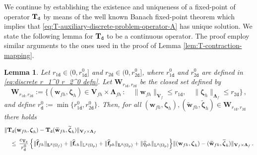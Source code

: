 \documentclass[11pt]{article}
\numberwithin{equation}{section}
\newcommand{\bLambda}{{\boldsymbol\Lambda}}
\newcommand{\bzeta}{{\boldsymbol\zeta}}
\newcommand{\bw}{{\mathbf{w}}}
\newcommand{\f}{\mathbf{f}}
\newcommand{\0}{{\mathbf{0}}}
\def\bV{\mathbf{V}}
\def\bW{\mathbf{W}}
\def\bT{\mathbf{T}}
\newcommand{\bL}{\mathbf{L}}
\newcommand\bbL{\mathbb{L}}
\def\L{\mathrm{L}}
\def\ttd{\mathtt{d}}
\def\wt{\widetilde}
\def\wh{\widehat}
\newtheorem{lem}[thm]{Lemma}
\numberwithin{equation}{section}
\begin{document}
We continue by establishing the existence and uniqueness of a fixed-point of operator $\bT_{\tt d}$ by means of the well known Banach fixed-point theorem which implies that \eqref{eq:T-auxiliary-discrete-problem-operator-A} has unique solution. We state the following lemma for $\bT_{\tt d}$ to be a continuous operator. 
The proof employ similar arguments to the ones used in the proof of Lemma \ref{lem:T-contraction-mapping}.
%
\begin{lem}\label{lem:T-discrete-contraction-mapping}
Let $r_{1\ttd}\in (0,r_{1\ttd}^0]$ and $r_{2\ttd}\in (0,r_{2\ttd}^0]$, where $r_{1\ttd}^0$ and $r_{2\ttd}^0$ are defined in \eqref{eq:discrete r_1^0 r_2^0 defn}. Let $\bW_{r_{1\ttd},r_{2\ttd}}$ be the closed set defined by
\begin{equation}\label{eq:Wr-discrete-definition}
\bW_{r_{1\ttd},r_{2\ttd}} := \Big\{ (\bw_{fh},\bzeta_{h})\in \bV_{fh}\times \bLambda_{fh} \,:\quad \| \bw_{fh}\|_{\bV_f} \leq r_{1\ttd},\quad \|\bzeta_{h}\|_{\bLambda_f} \leq r_{2\ttd} \Big\} \,,
\end{equation}
and define $r_\ttd^0:= \min\big\{r_{1\ttd}^0, r_{2\ttd}^0\big\}$. 
Then, for all $(\bw_{fh},\bzeta_{h}), (\wt{\bw}_{fh},\wt{\bzeta}_{h}) \in \bW_{r_{1\ttd},r_{2\ttd}}$ there holds 
\begin{align*}
&\|\bT_{\tt d}(\bw_{fh},\bzeta_{h}) - \bT_{\tt d}(\wt{\bw}_{fh},\wt{\bzeta}_{h}) \|_{\bV_f\times \bLambda_f}  \nonumber \\[1ex]
&\quad \leq\, \frac{c_{\bT_{\tt d}}}{r_\ttd^0}\,\Big\{ \|\wh{\f}_{fh}\|_{\bL^2(\Omega_f)} +  \|\wh{\f}_{eh}\|_{\bbL^2(\Omega_p)}+ \|\wh{\f}_{ph}\|_{\bL^2(\Omega_p)} + \| \wh{q}_{ph}\|_{\L^2(\Omega_p)} \Big\}\|(\bw_{fh},\bzeta_{h}) - (\wt{\bw}_{fh},\wt{\bzeta}_{h})\|_{\bV_f\times \bLambda_f}\,. %
\end{align*}
\end{lem}
\end{document}
